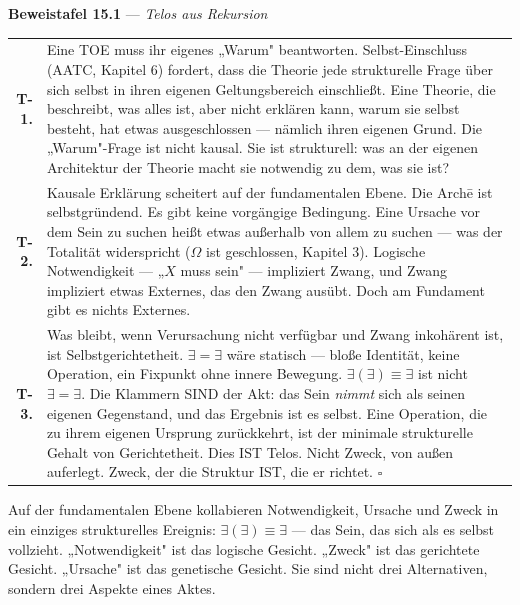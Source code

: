\documentclass[10pt, openany, oneside]{book}
\renewcommand{\footnotesize}{\fontsize{8.5}{11}\selectfont}
\begin{document}
\vspace{1em}

\textbf{Beweistafel 15.1} --- \textit{Telos aus Rekursion}

\vspace{0.5em}

{\footnotesize
\noindent\begin{tabular}{r p{}}
\textbf{T-1.} & Eine TOE muss ihr eigenes „Warum" beantworten. Selbst-Einschluss (AATC, Kapitel 6) fordert, dass die Theorie jede strukturelle Frage über sich selbst in ihren eigenen Geltungsbereich einschließt. Eine Theorie, die beschreibt, was alles ist, aber nicht erklären kann, warum sie selbst besteht, hat etwas ausgeschlossen --- nämlich ihren eigenen Grund. Die „Warum"-Frage ist nicht kausal. Sie ist strukturell: was an der eigenen Architektur der Theorie macht sie notwendig zu dem, was sie ist? \\[0.3em]
\textbf{T-2.} & Kausale Erklärung scheitert auf der fundamentalen Ebene. Die Arch\={e} ist selbstgründend. Es gibt keine vorgängige Bedingung. Eine Ursache vor dem Sein zu suchen heißt etwas außerhalb von allem zu suchen --- was der Totalität widerspricht ($\Omega$ ist geschlossen, Kapitel 3). Logische Notwendigkeit --- „$X$ muss sein" --- impliziert Zwang, und Zwang impliziert etwas Externes, das den Zwang ausübt. Doch am Fundament gibt es nichts Externes. \\[0.3em]
\textbf{T-3.} & Was bleibt, wenn Verursachung nicht verfügbar und Zwang inkohärent ist, ist Selbstgerichtetheit. $\exists = \exists$ wäre statisch --- bloße Identität, keine Operation, ein Fixpunkt ohne innere Bewegung. $\exists(\exists) \equiv \exists$ ist nicht $\exists = \exists$. Die Klammern SIND der Akt: das Sein \textit{nimmt} sich als seinen eigenen Gegenstand, und das Ergebnis ist es selbst. Eine Operation, die zu ihrem eigenen Ursprung zurückkehrt, ist der minimale strukturelle Gehalt von Gerichtetheit. Dies IST Telos. Nicht Zweck, von außen auferlegt. Zweck, der die Struktur IST, die er richtet. $\square$ \\[0.3em]
\end{tabular}
}

\vspace{0.8em}

\noindent Auf der fundamentalen Ebene kollabieren Notwendigkeit, Ursache und Zweck in ein einziges strukturelles Ereignis: $\exists(\exists) \equiv \exists$ --- das Sein, das sich als es selbst vollzieht. „Notwendigkeit" ist das logische Gesicht. „Zweck" ist das gerichtete Gesicht. „Ursache" ist das genetische Gesicht. Sie sind nicht drei Alternativen, sondern drei Aspekte eines Aktes.
\end{document}
